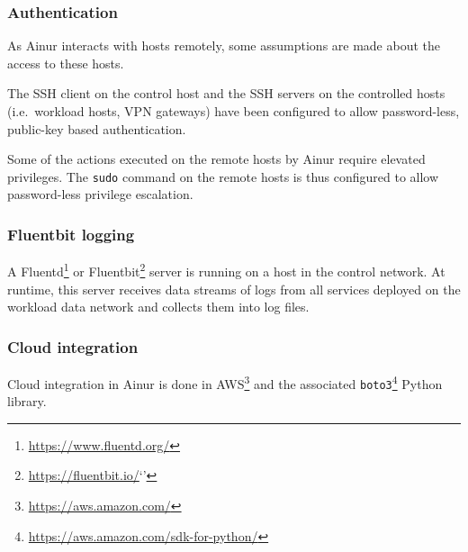 \subsubsection{Authentication}
As Ainur interacts with hosts remotely, some assumptions are made about the access to these hosts.

\begin{description}[style=unboxed]
    \item[SSH access] 
    
    The \ac{SSH} client on the control host and the \ac{SSH} servers on the controlled hosts (i.e.\ workload hosts, \ac{VPN} gateways) have been configured to allow password-less, public-key based authentication.

    \item[\texttt{sudo} access]
    
    Some of the actions executed on the remote hosts by Ainur require elevated privileges.
    The \texttt{sudo} command on the remote hosts is thus configured to allow password-less privilege escalation.

\end{description} 

\subsubsection{Fluentbit logging}

A Fluentd\footnote{\url{https://www.fluentd.org/}} or Fluentbit\footnote{\url{https://fluentbit.io/}`'} server is running on a host in the control network.
At runtime, this server receives data streams of logs from all services deployed on the workload data network and collects them into log files.

\subsubsection{Cloud integration}

Cloud integration in Ainur is done in \ac{AWS}\footnote{\url{https://aws.amazon.com/}} and the associated \texttt{boto3}\footnote{\url{https://aws.amazon.com/sdk-for-python/}} Python library.


